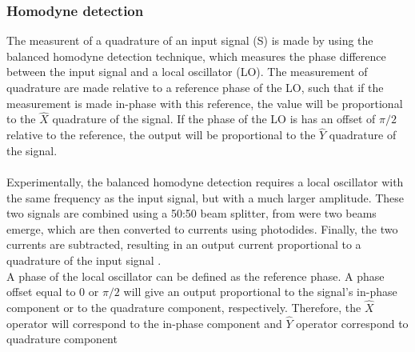 \begin{bibunit}[plain]
\subsubsection{Homodyne detection}

The measurent of a quadrature of an input signal (S) is made by using the balanced homodyne detection technique, which measures the phase difference between the input signal and a local oscillator (LO). The measurement of quadrature are made relative to a reference phase of the LO, such that if the measurement is made in-phase with this reference, the value will be proportional to the $\hat{X}$ quadrature of the signal. If the phase of the LO is has an offset of $\pi/2$ relative to the reference, the output will be proportional to the $\hat{Y}$ quadrature of the signal.\\
\\
Experimentally, the balanced homodyne detection requires a local oscillator with the same frequency as the input signal, but with a much larger amplitude. These two signals are combined using a 50:50 beam splitter, from were two beams emerge, which are then converted to currents using photodides. Finally, the two currents are subtracted, resulting in an output current proportional to a quadrature of the input signal
\cite{fox2006}.\\
%
A phase of the local oscillator can be defined as the reference phase. A phase offset equal to $0$ or $\pi/2$ will give an output proportional to the signal's in-phase component or to the quadrature component, respectively. Therefore, the $\hat{X}$ operator will correspond to the in-phase component and $\hat{Y}$ operator correspond to quadrature component
\\
%
\begin{figure}[H]
	\label{fig:scheme_homodyne}
	\centering

\end{figure}
\end{bibunit}
